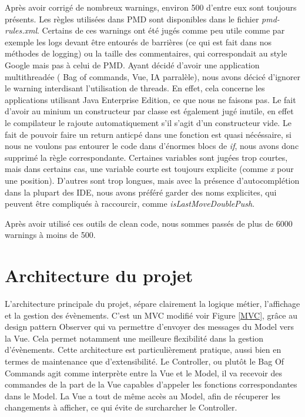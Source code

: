 \documentclass{article}
\begin{document}
Après avoir corrigé de nombreux warnings, environ 500 d'entre eux sont toujours présents.
Les règles utilisées dans PMD sont disponibles dans le fichier \textit{pmd-rules.xml}.
Certains de ces warnings ont été jugés
comme peu utile comme par exemple les logs devant être entourés de barrières (ce qui est fait dans nos méthodes de logging) ou la taille des commentaires,
qui correspondait au style Google mais pas à celui de PMD.
Ayant décidé d'avoir une application multithreadée ( Bag of commands, Vue, IA parralèle), nous avons décicé d'ignorer le warning interdisant l'utilisation de threads.
En effet, cela concerne les applications utilisant Java Enterprise Edition, ce que nous ne faisons pas.
Le fait d'avoir au minium un constructeur par classe est également jugé inutile, en effet le compilateur le rajoute automatiquement s'il s'agit d'un constructeur vide.
Le fait de pouvoir faire un return anticpé dans une fonction est quasi nécéssaire, si nous ne voulons pas entourer le code dans
d'énormes blocs de \textit{if}, nous avons donc supprimé la règle correspondante.
Certaines variables sont jugées trop courtes, mais dans certains cas, une variable courte est toujours explicite (comme \textit{x} pour une position).
D'autres sont trop longues, mais avec la présence d'autocomplétion dans la plupart des IDE, nous avons préféré garder des noms explicites, qui peuvent être compliqués à raccourcir,
comme \textit{isLastMoveDoublePush}.

Après avoir utilisé ces outils de clean code, nous sommes passés de plus de 6000 warnings à moins de 500.

\section{Architecture du projet}
L'architecture principale du projet, sépare clairement la logique métier, l'affichage et la gestion des évènements. C'est un MVC modifié voir Figure \ref{MVC},
grâce au design pattern Observer qui va permettre d'envoyer des messages du Model vers la Vue. Cela permet notamment une meilleure flexibilité dans la
gestion d'évènements.
Cette architecture est particulièrement pratique, aussi bien en termes de maintenance que d'extensibilité.
Le Controller, ou plutôt le Bag Of Commands agit comme interprète entre la Vue et le Model, il va recevoir des commandes de la part de la Vue capables d'appeler les fonctions correspondantes dans le Model.
La Vue a tout de même accès au Model, afin de récuperer les changements à afficher, ce qui évite de surcharcher le Controller.
\end{document}
